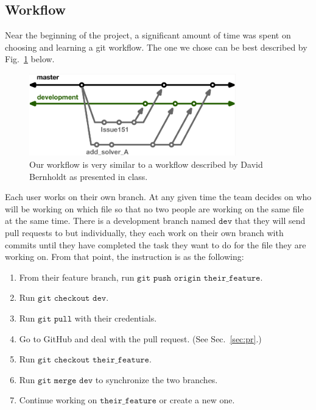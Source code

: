 \documentclass{article}
\begin{document}
\subsection{Workflow}
Near the beginning of the project, a significant amount of time was spent on choosing and learning a git workflow.  The one we chose can be best described by Fig.~\ref{fig:wf} below.  
\begin{figure}[ht]
    \centering
    \includegraphics[width=0.8\textwidth]{index.png}
    \caption{Our workflow is very similar to a workflow described by David Bernholdt as presented in class.}
    \label{fig:wf}
\end{figure}
Each user works on their own branch.  At any given time the team decides on who will be working on which file so that no two people are working on the same file at the same time.  There is a development branch named $\texttt{dev}$ that they will send pull requests to but individually, they each work on their own branch with commits until they have completed the task they want to do for the file they are working on.  From that point, the instruction is as the following:
\begin{enumerate}
    \item From their feature branch, run $\texttt{git push origin their\_feature}$.
    \item Run $\texttt{git checkout dev}$.
    \item Run $\texttt{git pull}$ with their credentials.
    \item Go to GitHub and deal with the pull request. (See Sec.~\ref{sec:pr}.)
    \item Run $\texttt{git checkout their\_feature}$.
    \item Run $\texttt{git merge dev}$ to synchronize the two branches.
    \item Continue working on $\texttt{their\_feature}$ or create a new one.
\end{enumerate}
\end{document}

